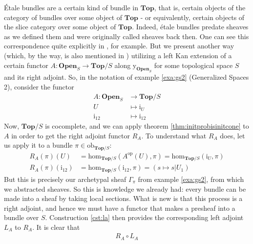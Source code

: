 \begin{exa}
\label{exa:sheafetale}
{\'E}tale bundles are a certain kind of bundle in $\mathbf{Top}$, that is, certain objects of the category of bundles over some object of $\mathbf{Top}$ - or equivalently, certain objects of the slice category over some object of $\mathbf{Top}$.
Indeed, {\'e}tale bundles predate sheaves as we defined them and were originally called sheaves back then.
One can see this correspondence quite explicitly in \cite{c55c71e8}, for example.
But we present another way (which, by the way, is also mentioned in \cite{c55c71e8}) utilizing a left Kan extension of a certain functor $A \colon \mathbf{Open}_{S} \rightarrow \mathbf{Top} \slash S$ along $\mathrm{y}_{\mathbf{Open}_{S}}$ for some topological space $S$ and its right adjoint.
So, in the notation of example \ref{exa:gs2} (Generalized Spaces 2), consider the functor
\begin{align*}
  A
  \colon
  \mathbf{Open}_{S}
  &\rightarrow
  \mathbf{Top}
  \slash
  S
  \\
  U
  &\mapsto
  \mathrm{i}_{U}
  \\
  \mathrm{i}_{12}
  &\mapsto
  \mathrm{i}_{12}
\end{align*}
Now, $\mathbf{Top} \slash S$ is cocomplete, and we can apply theorem \ref{thm:initprobisinitcone} to $A$ in order to get the right adjoint functor $R_{A}$.
To understand what $R_{A}$ does, let us apply it to a bundle $\pi \in \mathrm{ob}_{\mathbf{Top} \slash S}$:
\begin{align*}
  R_{A}(\pi)(U)
  &=
  \mathrm{hom}_{\mathbf{Top} \slash S}
  \left(
    A^{\textrm{op}}(U),
    \pi
  \right)
  =
  \mathrm{hom}_{\mathbf{Top} \slash S}
  \left(
    \mathrm{i}_{U},
    \pi
  \right)
  \\
  R_{A}(\pi)(\mathrm{i}_{12})
  &=
  \mathrm{hom}_{\mathbf{Top} \slash S}
  \left(
    \mathrm{i}_{12},
    \pi
  \right)
  =
  \left(
    s
    \mapsto
    s
    \vert
    U_{1}
  \right)
\end{align*}
But this is precisely our archetypal sheaf $\Gamma_{\pi}$ from example \ref{exa:gs2}, from which we abstracted sheaves.
So this is knowledge we already had: every bundle can be made into a sheaf by taking local sections.
What is new is that this process is a right adjoint, and hence we must have a functor that makes a presheaf into a bundle over $S$.
Construction \ref{cst:la} then provides the corresponding left adjoint $L_{A}$ to $R_{A}$.
It is clear that
\begin{align*}
  R_{A}
  \circ
  L_{A}
\end{align*}

\end{exa}
